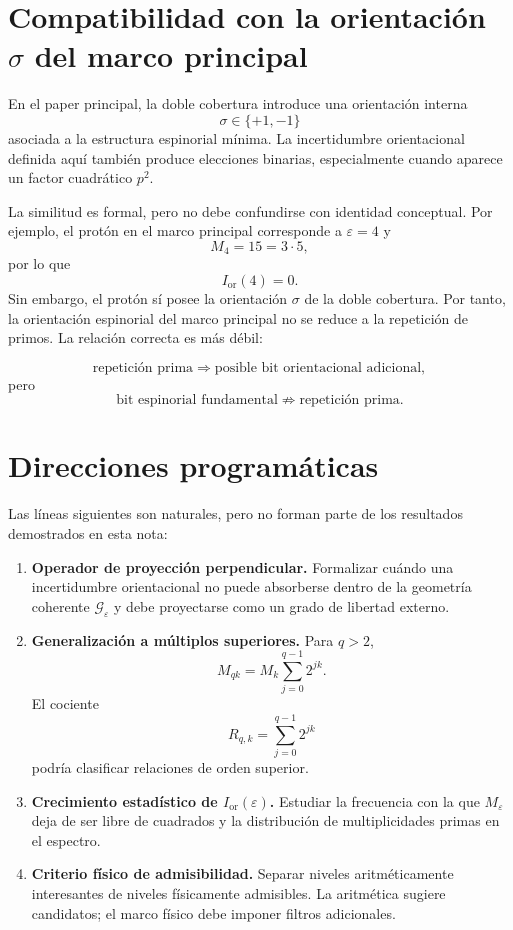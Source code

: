 \documentclass[11pt]{article}
\newcommand{\Ior}{I_{\mathrm{or}}}
\begin{document}
\clearpage
\section{Compatibilidad con la orientación $\sigma$ del marco principal}

En el paper principal, la doble cobertura introduce una orientación interna
\[
\sigma\in\{+1,-1\}
\]
asociada a la estructura espinorial mínima. La incertidumbre orientacional definida aquí también produce elecciones binarias, especialmente cuando aparece un factor cuadrático $p^2$.

La similitud es formal, pero no debe confundirse con identidad conceptual. Por ejemplo, el protón en el marco principal corresponde a $\varepsilon=4$ y
\[
M_4=15=3\cdot5,
\]
por lo que
\[
\Ior(4)=0.
\]
Sin embargo, el protón sí posee la orientación $\sigma$ de la doble cobertura. Por tanto, la orientación espinorial del marco principal no se reduce a la repetición de primos. La relación correcta es más débil:

\[
\text{repetición prima} \Longrightarrow \text{posible bit orientacional adicional},
\]
pero
\[
\text{bit espinorial fundamental} \not\Longrightarrow \text{repetición prima}.
\]

\clearpage
\section{Direcciones programáticas}

Las líneas siguientes son naturales, pero no forman parte de los resultados demostrados en esta nota:

\begin{enumerate}[leftmargin=*]
\item \textbf{Operador de proyección perpendicular.}
Formalizar cuándo una incertidumbre orientacional no puede absorberse dentro de la geometría coherente $\mathcal{G}_\varepsilon$ y debe proyectarse como un grado de libertad externo.

\item \textbf{Generalización a múltiplos superiores.}
Para $q>2$,
\[
M_{qk}=M_k\sum_{j=0}^{q-1}2^{jk}.
\]
El cociente
\[
R_{q,k}=\sum_{j=0}^{q-1}2^{jk}
\]
podría clasificar relaciones de orden superior.

\item \textbf{Crecimiento estadístico de $\Ior(\varepsilon)$.}
Estudiar la frecuencia con la que $M_\varepsilon$ deja de ser libre de cuadrados y la distribución de multiplicidades primas en el espectro.

\item \textbf{Criterio físico de admisibilidad.}
Separar niveles aritméticamente interesantes de niveles físicamente admisibles. La aritmética sugiere candidatos; el marco físico debe imponer filtros adicionales.
\end{enumerate}
\end{document}
